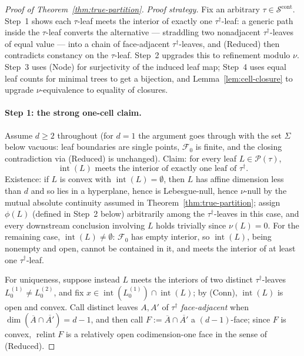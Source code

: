 \documentclass[11pt]{article}
\theoremstyle{plain}
\theoremstyle{definition}
\theoremstyle{remark}
\newcommand{\cS}{\mathcal{S}}
\newcommand{\cP}{\mathcal{P}}
\newcommand{\cF}{\mathcal{F}}
\begin{document}
\begin{proof}[Proof of Theorem~\ref{thm:true-partition}]
\emph{Proof strategy.} Fix an arbitrary \(\tau\in\cS^{\mathrm{cont}}\). Step~1
shows each \(\tau\)-leaf meets the interior of exactly one
\(\tau^{\dagger}\)-leaf: a generic path inside the \(\tau\)-leaf converts the
alternative --- straddling two nonadjacent \(\tau^{\dagger}\)-leaves of equal
value --- into a chain of face-adjacent \(\tau^{\dagger}\)-leaves, and
(Reduced) then contradicts constancy on the \(\tau\)-leaf. Step~2 upgrades
this to refinement modulo \(\nu\). Step~3 uses (Node) for surjectivity of
the induced leaf map; Step~4 uses equal leaf counts for minimal trees to get
a bijection, and Lemma~\ref{lem:cell-closure} to upgrade \(\nu\)-equivalence
to equality of closures.

\paragraph*{Step 1: the strong one-cell claim.}
Assume \(d\ge2\) throughout (for \(d=1\) the argument goes through with the
set \(\Sigma\) below vacuous: leaf boundaries are single points, \(\cF_0\)
is finite, and the closing contradiction via (Reduced) is unchanged). Claim:
for every leaf \(L\in\cP(\tau)\),
\[
\tag{\(\star\)}
\operatorname{int}(L)\text{ meets the interior of exactly one leaf of }\tau^{\dagger}.
\]
Existence: if \(L\) is convex with \(\operatorname{int}(L)=\emptyset\),
then \(L\) has affine dimension less than \(d\) and so lies in a
hyperplane, hence is Lebesgue-null, hence \(\nu\)-null by the mutual
absolute continuity assumed in Theorem~\ref{thm:true-partition}; assign
\(\phi(L)\) (defined in Step~2 below) arbitrarily among the
\(\tau^{\dagger}\)-leaves in this case, and every downstream conclusion
involving \(L\) holds trivially since \(\nu(L)=0\). For the remaining
case, \(\operatorname{int}(L)\ne\emptyset\): \(\cF_0\) has empty interior,
so \(\operatorname{int}(L)\), being nonempty and open, cannot be contained
in it, and meets the interior of at
least one \(\tau^{\dagger}\)-leaf.

For uniqueness, suppose instead \(L\) meets the interiors of two distinct
\(\tau^{\dagger}\)-leaves \(L_0^{(1)}\ne L_0^{(2)}\), and fix
\(x\in\operatorname{int}(L_0^{(1)})\cap\operatorname{int}(L)\); by (Conn),
\(\operatorname{int}(L)\) is open and convex. Call distinct leaves
\(A,A'\) of \(\tau^{\dagger}\) \emph{face-adjacent} when
\(\dim(\overline A\cap\overline{A'})=d-1\), and then call
\(F:=\overline A\cap\overline{A'}\) a \((d-1)\)-face; since \(F\) is convex,
\(\operatorname{relint}F\) is a relatively open codimension-one face in the
sense of (Reduced).


\end{proof}
\end{document}
